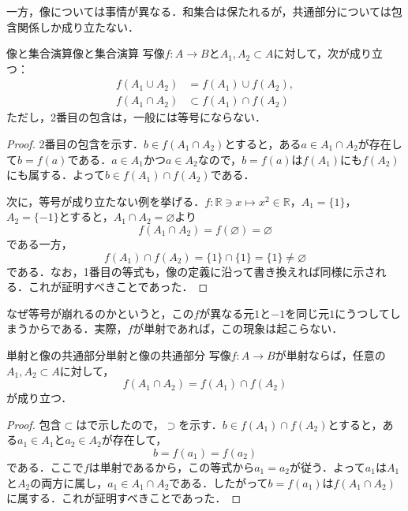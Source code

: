 一方，像については事情が異なる．和集合は保たれるが，共通部分については包含関係しか成り立たない．

\begin{prop}{像と集合演算}{像と集合演算}
  写像$f \colon A \to B$と$A_1, A_2 \subset A$に対して，次が成り立つ：
  \begin{align*}
    f(A_1 \cup A_2) & = f(A_1) \cup f(A_2), \\
    f(A_1 \cap A_2) & \subset f(A_1) \cap f(A_2)
  \end{align*}
  ただし，2番目の包含は，一般には等号にならない．
\end{prop}

\begin{tleftbar}
  \begin{proof}
    2番目の包含を示す．$b \in f(A_1 \cap A_2)$とすると，ある$a \in A_1 \cap A_2$が存在して$b = f(a)$である．$a \in A_1$かつ$a \in A_2$なので，$b = f(a)$は$f(A_1)$にも$f(A_2)$にも属する．よって$b \in f(A_1) \cap f(A_2)$である．

    次に，等号が成り立たない例を挙げる．$f \colon \mathbb{R} \ni x \mapsto x^2 \in \mathbb{R}$，$A_1 = \{1\}$，$A_2 = \{-1\}$とすると，$A_1 \cap A_2 = \varnothing$より
    \[
      f(A_1 \cap A_2) = f(\varnothing) = \varnothing
    \]
    である一方，
    \[
      f(A_1) \cap f(A_2) = \{1\} \cap \{1\} = \{1\} \ne \varnothing
    \]
    である．なお，1番目の等式も，像の定義に沿って書き換えれば同様に示される．これが証明すべきことであった．
  \end{proof}
\end{tleftbar}

なぜ等号が崩れるのかというと，この$f$が異なる元$1$と$-1$を同じ元$1$にうつしてしまうからである．実際，$f$が単射であれば，この現象は起こらない．

\begin{prop}{単射と像の共通部分}{単射と像の共通部分}
  写像$f \colon A \to B$が単射ならば，任意の$A_1, A_2 \subset A$に対して，
  \[
    f(A_1 \cap A_2) = f(A_1) \cap f(A_2)
  \]
  が成り立つ．
\end{prop}

\begin{tleftbar}
  \begin{proof}
    包含$\subset$はで示したので，$\supset$を示す．$b \in f(A_1) \cap f(A_2)$とすると，ある$a_1 \in A_1$と$a_2 \in A_2$が存在して，
    \[
      b = f(a_1) = f(a_2)
    \]
    である．ここで$f$は単射であるから，この等式から$a_1 = a_2$が従う．よって$a_1$は$A_1$と$A_2$の両方に属し，$a_1 \in A_1 \cap A_2$である．したがって$b = f(a_1)$は$f(A_1 \cap A_2)$に属する．これが証明すべきことであった．
  \end{proof}
\end{tleftbar}

